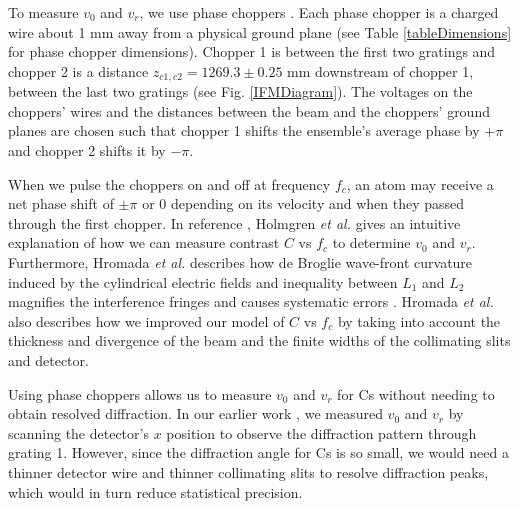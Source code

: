 \documentclass[twocolumn,prl,showpacs,superscriptaddress]{revtex4-1}   %
\newcommand{\figref}[1]{Fig. \ref{#1}}
\newcommand{\etalspace}{\textit{et al. }}
\begin{document}

To measure $v_0$ and $v_r$, we use phase choppers \cite{Holmgren2011,Hromada2014}. Each phase chopper is a charged wire about 1 mm away from a physical ground plane (see Table \ref{tableDimensions} for phase chopper dimensions). Chopper 1 is between the first two gratings and chopper 2 is a distance $z_{c1,c2} = 1269.3 \pm 0.25$ mm downstream of chopper 1, between the last two gratings (see \figref{IFMDiagram}). The voltages on the choppers' wires and the distances between the beam and the choppers' ground planes are chosen such that chopper 1 shifts the ensemble's average phase by $+\pi$ and chopper 2 shifts it by $-\pi$. 

When we pulse the choppers on and off at frequency $f_c$, an atom may receive a net phase shift of $\pm\pi$ or $0$ depending on its velocity and when they passed through the first chopper. 
In reference \cite{Holmgren2011}, Holmgren \etalspace gives an intuitive explanation of how
we can measure contrast $C$ vs $f_c$ to determine $v_0$ and $v_r$. 
Furthermore, Hromada \etalspace describes how de Broglie wave-front curvature induced by the cylindrical electric fields and inequality between $L_1$ and $L_2$ magnifies the interference fringes and causes systematic errors \cite{Hromada2014}. Hromada \etalspace also describes how we improved our model of $C$ vs $f_c$ by taking into account the thickness and divergence of the beam and the finite widths of the collimating slits and detector. 

Using phase choppers allows us to measure $v_0$ and $v_r$ for Cs without needing to obtain resolved diffraction. In our earlier work \cite{Holmgren2010}, we measured $v_0$ and $v_r$ by scanning the detector's $x$ position to observe the diffraction pattern through grating 1. However, since the diffraction angle for Cs is so small, we would need a thinner detector wire and thinner collimating slits to resolve diffraction peaks, which would in turn reduce statistical precision.
\end{document}
